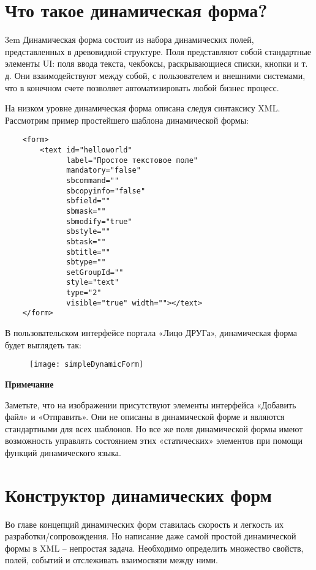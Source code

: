 \documentclass[../index.tex]{subfiles}
\begin{document}
\section{Что такое динамическая форма?}
\emergencystretch 3em
Динамическая форма состоит из набора динамических полей, представленных в древовидной структуре.
Поля представляют собой стандартные элементы UI: поля ввода текста, чекбоксы, раскрывающиеся списки, кнопки и т. д.
Они взаимодействуют между собой, с пользователем и внешними системами,
что в конечном счете позволяет автоматизировать любой бизнес процесс.

На низком уровне динамическая форма описана следуя синтаксису XML.
Рассмотрим пример простейшего шаблона динамической формы:
\begin{verbatim}
    <form>
        <text id="helloworld"
              label="Простое текстовое поле"
              mandatory="false"
              sbcommand=""
              sbcopyinfo="false"
              sbfield=""
              sbmask=""
              sbmodify="true"
              sbstyle=""
              sbtask=""
              sbtitle=""
              sbtype=""
              setGroupId=""
              style="text"
              type="2"
              visible="true" width=""></text>
    </form>
\end{verbatim}

В пользовательском интерфейсе портала «Лицо ДРУГа», динамическая форма будет выглядеть так:

\begin{figure}[h]
	\texttt{[image: simpleDynamicForm]}
	\centering
\end{figure}

\textbf{Примечание}

Заметьте, что на изображении присутствуют элементы интерфейса «Добавить файл» и «Отправить».
Они не описаны в динамической форме и являются стандартными для всех шаблонов.
Но все же поля динамической формы имеют возможность управлять состоянием этих «статических» элементов
при помощи функций динамического языка.

\section{Конструктор динамических форм}
Во главе концепций динамических форм ставилась скорость и легкость их разработки/сопровождения.
Но написание даже самой простой динамической формы в XML – непростая задача.
Необходимо определить множество свойств, полей, событий и отслеживать взаимосвязи между ними.
\end{document}
